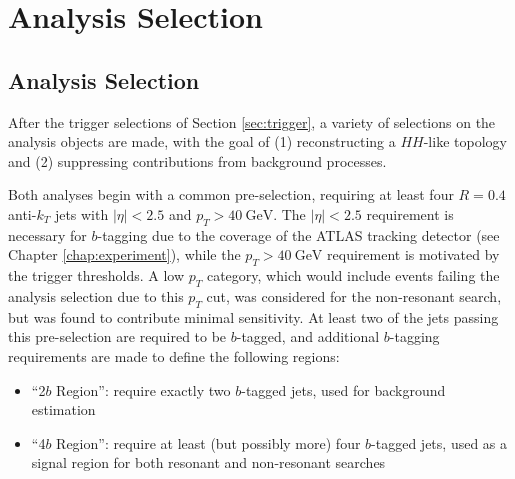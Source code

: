 \chapter{Analysis Selection}
\label{chap:bbbb-selection}

\section{Analysis Selection}
\label{sec:analysis-selection}
After the trigger selections of Section \ref{sec:trigger}, a variety of selections on the analysis objects
are made, with the goal of (1) reconstructing a $HH$-like topology and (2) suppressing contributions from 
background processes. 

Both analyses begin with a common pre-selection, requiring at least four $R=0.4$ anti-$k_{T}$ jets with 
$|\eta| < 2.5$ and $p_{T} > \SI{40}{\GeV}$. The $|\eta| < 2.5$ requirement is necessary for $b$-tagging
due to the coverage of the ATLAS tracking detector (see Chapter \ref{chap:experiment}), 
while the $p_{T} > \SI{40}{\GeV}$ requirement is motivated by the trigger thresholds. A low $p_{T}$ category, 
which would include events failing the analysis selection due to this $p_{T}$ cut, 
was considered for the non-resonant search, but was found to contribute minimal sensitivity.
At least two of the jets passing this pre-selection are required to be $b$-tagged, and additional $b$-tagging 
requirements are made to define the following regions:
\begin{itemize}
	\item ``2$b$ Region'': require exactly two $b$-tagged jets, used for background estimation
	\item ``4$b$ Region'': require at least (but possibly more) four $b$-tagged jets, used as a signal
	region for both resonant and non-resonant searches
\end{itemize}

